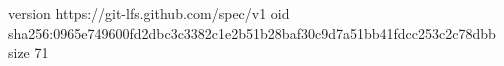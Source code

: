 version https://git-lfs.github.com/spec/v1
oid sha256:0965e749600fd2dbc3c3382c1e2b51b28baf30c9d7a51bb41fdcc253c2c78dbb
size 71
